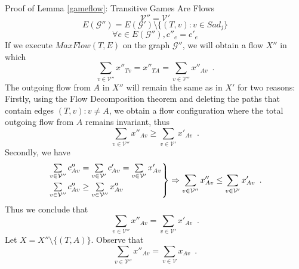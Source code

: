 \begin{sepproof}{Proof of Lemma \ref{gameflow}: Transitive Games Are Flows}
\begin{equation*}
      \mathcal{V}'' = \mathcal{V}'
   \end{equation*}
   \begin{equation*}
      E(\mathcal{G}'') = E(\mathcal{G}') \setminus \{(T, v) : v \in Sad_j\}
   \end{equation*}
   \begin{equation*}
      \forall e \in E(\mathcal{G}''), c''_e = c'_e
   \end{equation*}
   If we execute $MaxFlow(T, E)$ on the graph $\mathcal{G}''$, we will obtain a flow $X''$ in which
   \begin{equation*}
      \sum\limits_{v \in \mathcal{V}''}x''_{Tv} = x''_{TA} = \sum\limits_{v \in \mathcal{V}''}x''_{Av} \enspace.
   \end{equation*}
   The outgoing flow from $A$ in $X''$ will remain the same as in $X'$ for two reasons: Firstly, using the Flow
   Decomposition theorem \cite{amo} and deleting the paths that contain edges $\left(T, v\right): v \neq A$, we
   obtain a flow configuration where the total outgoing flow from $A$ remains invariant,
   thus
   \begin{equation*}
      \sum\limits_{v \in \mathcal{V}''}x''_{Av} \geq \sum\limits_{v \in \mathcal{V}'}x'_{Av} \enspace.
   \end{equation*}
   Secondly, we have
   \begin{equation*}
      \begin{rcases}
         \sum\limits_{v \in \mathcal{V}''}c''_{Av} = \sum\limits_{v \in \mathcal{V}'}c'_{Av} = \sum\limits_{v \in
         \mathcal{V}'}x'_{Av} \\
         \sum\limits_{v \in \mathcal{V}''}c''_{Av} \geq \sum\limits_{v \in \mathcal{V}''}x''_{Av}
      \end{rcases}
      \Rightarrow \sum\limits_{v \in \mathcal{V}''}x''_{Av} \leq \sum\limits_{v \in \mathcal{V}'}x'_{Av} \enspace.
   \end{equation*}
   Thus we conclude that
   \begin{equation}
   \label{primeequaldoubleprime}
      \sum\limits_{v \in \mathcal{V}''}x''_{Av} = \sum\limits_{v \in \mathcal{V}'}x'_{Av} \enspace.
   \end{equation}
   Let $X = X'' \setminus \{(T, A)\}$. Observe that
   \begin{equation*}
      \sum\limits_{v \in \mathcal{V}''}x''_{Av} = \sum\limits_{v \in \mathcal{V}}x_{Av} \enspace.
   \end{equation*}

\end{sepproof}
